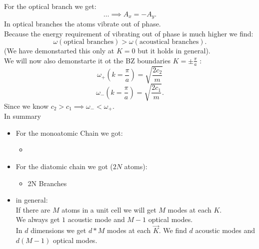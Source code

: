 \documentclass{report}
\begin{document}
For the optical branch we get:
\[
\text{\ldots} \implies A_x = -A_y
.\] 
In optical branches the atoms vibrate out of phase.\\
Because the energy requirement of vibrating out of phase is much higher we find: \[
	\omega\left( \text{optical branches} \right) > \omega\left( \text{acoustical branches} \right) 
.\] (We have demonstarted this only at $K = 0$ but it holds in general).\\
We will now also demonstarte it ot the BZ boundaries $K = \pm \frac{\pi}{a}$ : \[
	\omega_+\left( k = \frac{\pi}{a} \right) = \sqrt{\frac{2c_2}{m}} 
\]\[
\omega_-\left( k = \frac{\pi}{a} \right) = \sqrt{\frac{2c_1}{m}} 
.\]  Since we know $c_2 > c_1 \implies \omega_- < \omega_+$.\\
In summary
\begin{itemize}
	\item For the monoatomic Chain we got:\\
		\begin{itemize}
			\item 
		\end{itemize}
	\item For the diatomic chain we got ($2N$ atoms):
		\begin{itemize}
			\item 2N Branches
		\end{itemize}
	\item in general:\\
		If there are $M$ atoms in a unit cell we will get $M$ modes at each $K$.\\
		We always get $1$ acoustic mode and $M-1$ optical modes.\\
		In $d$ dimensions we get $d*M$ modes at each $\vec{K}$. We find $d$ acoustic modes and $d\left( M-1 \right) $ optical modes.
\end{itemize}
\end{document}
